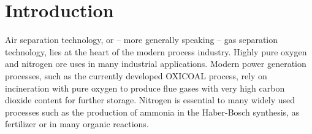 \chapter{Introduction}
\label{chp:intro}

Air separation technology, or -- more generally speaking -- gas separation technology, lies at the heart of the modern 
process industry. Highly pure oxygen and nitrogen ore uses in many industrial applications. Modern power generation
processes, such as the currently developed OXICOAL process, rely on incineration with pure oxygen to produce
flue gases with very high carbon dioxide content for further storage. Nitrogen is essential to many widely used 
processes such as the production of ammonia in the Haber-Bosch synthesis, as  fertilizer or in many organic reactions. 